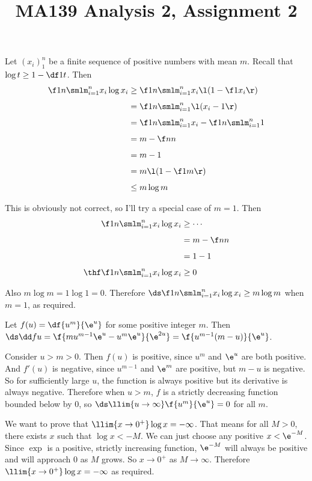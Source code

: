 \documentclass[a4paper]{article}
\title{MA139 Analysis 2, Assignment 2}
\begin{document}
\maketitle

\setlength{\parindent}{0em}
\setlength{\parskip}{1em}


Let $(x_i)_1^n$ be a finite sequence of positive numbers with mean $m$. Recall that $\log t \ge 1 - \df1t$. Then \begin{align*}
\f1n \smlm_{i=1}^n x_i \log x_i &\ge \f1n \smlm_{i=1}^n x_i \l(1 - \f1{x_i}\r)\\[1ex]
&= \f1n \smlm_{i=1}^n \l(x_i - 1\r)\\[1ex]
&= \f1n \smlm_{i=1}^n x_i - \f1n \smlm_{i=1}^n 1\\[1ex]
&= m - \f nn\\[1ex]
&= m - 1\\[1ex]
&= m \l(1 - \f1m\r)\\[1ex]
&\le m \log m
\end{align*}

This is obviously not correct, so I'll try a special case of $m=1$. Then \begin{align*}
\f1n \smlm_{i=1}^n x_i \log x_i &\ge \cdots\\[1ex]
&= m - \f nn\\[1ex]
&= 1 - 1\\[1ex]
\thf \f1n \smlm_{i=1}^n x_i \log x_i &\ge 0
\end{align*}

Also $m \log m = 1 \log 1 = 0$. Therefore $\ds \f1n \smlm_{i=1}^n x_i \log x_i \ge m \log m$ when $m=1$, as required.


Let $f(u) = \df{u^m}{\e^u}$ for some positive integer $m$. Then $\ds \dd fu = \f{m u^{m-1} \e^u - u^m \e^u}{\e^{2u}} = \f{u^{m-1} (m - u)}{\e^u}$.

Consider $u > m > 0$. Then $f(u)$ is positive, since $u^m$ and $\e^u$ are both positive. And $f'(u)$ is negative, since $u^{m-1}$ and $\e^m$ are positive, but $m - u$ is negative. So for sufficiently large $u$, the function is always positive but its derivative is always negative. Therefore when $u > m$, $f$ is a strictly decreasing function bounded below by $0$, so $\ds \llim{u \to \infty} \f{u^m}{\e^u} = 0$ for all $m$.


We want to prove that $\llim{x \to 0^+} \log x = -\infty$. That means for all $M > 0$, there exists $x$ such that $\log x < -M$. We can just choose any positive $x < \e^{-M}$. Since $\exp$ is a positive, strictly increasing function, $\e^{-M}$ will always be positive and will approach 0 as $M$ grows. So $x \to 0^+$ as $M \to \infty$. Therefore $\llim{x \to 0^+} \log x = -\infty$ as required.
\end{document}

